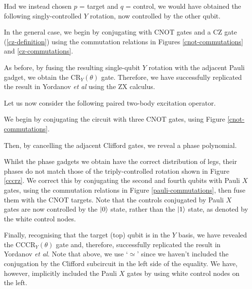 
Had we instead chosen $p$ = target and $q$ = control, we would have obtained the following singly-controlled $Y$ rotation, now controlled by the other qubit.


In the general case, we begin by conjugating with CNOT gates and a CZ gate (\ref{cz-definition}) using the commutation relations in Figures \ref{cnot-commutations} and \ref{cz-commutations}.


As before, by fusing the resulting single-qubit $Y$ rotation with the adjacent Pauli gadget, we obtain the CR$_Y(\theta)$ gate. Therefore, we have successfully replicated the result in Yordanov \textit{et al} using the ZX calculus.


Let us now consider the following paired two-body excitation operator.


We begin by conjugating the circuit with three CNOT gates, using Figure \ref{cnot-commutations}.


Then, by cancelling the adjacent Clifford gates, we reveal a phase polynomial.


Whilst the phase gadgets we obtain have the correct distribution of legs, their phases do not match those of the triply-controlled rotation shown in Figure \ref{cccrz}. We correct this by conjugating the second and fourth qubits with Pauli $X$ gates, using the commutation relations in Figure \ref{pauli-commutations}, then fuse them with the CNOT targets. Note that the controls conjugated by Pauli $X$ gates are now controlled by the $\ket 0$ state, rather than the $\ket 1$ state, as denoted by the white control nodes.


Finally, recognising that the target (top) qubit is in the $Y$ basis, we have revealed the CCCR$_Y(\theta)$ gate and, therefore, successfully replicated the result in Yordanov \textit{et al}. Note that above, we use `$\simeq$' since we haven't included the conjugation by the Clifford subcircuit in the left side of the equality. We have, however, implicitly included the Pauli $X$ gates by using white control nodes on the left.

